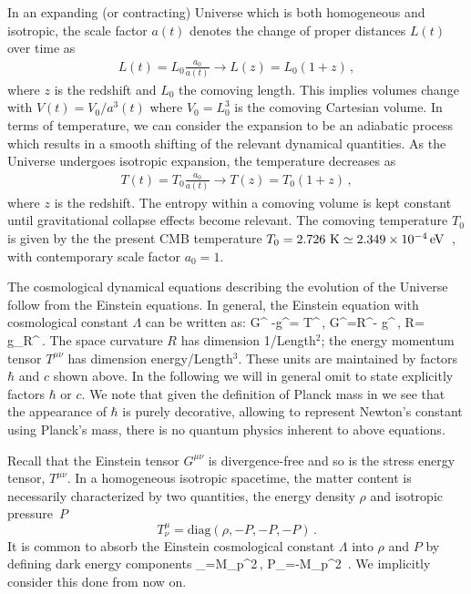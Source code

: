 In an expanding (or contracting) Universe which is both homogeneous and isotropic, the scale factor $a(t)$ denotes the change of proper distances $L(t)$ over time as
\begin{gather}
 L(t)=L_{0}\frac{a_{0}}{a(t)}\rightarrow L(z)=L_{0}(1+z)\,,
\end{gather}
where $z$ is the redshift and $L_{0}$ the comoving length. This implies volumes change with $V(t)=V_{0}/a^{3}(t)$ where $V_{0}=L_{0}^{3}$ is the comoving Cartesian volume. In terms of temperature, we can consider the expansion to be an adiabatic process~\cite{Abdalla:2022yfr} which results in a smooth shifting of the relevant dynamical quantities. As the Universe undergoes isotropic expansion, the temperature decreases as 
\begin{gather}
 \label{tscale}
 T(t)=T_{0}\frac{a_{0}}{a(t)}\rightarrow T(z)=T_{0}(1+z)\,,
\end{gather}
where $z$ is the redshift. The entropy within a comoving volume is kept constant until gravitational collapse effects become relevant. The comoving temperature $T_{0}$ is given by the the present CMB temperature $T_{0}=2.726{\rm\ K}\simeq 2.349\times10^{-4}\text{\,eV}$~\cite{Planck:2018vyg}, with contemporary scale factor $a_{0}=1$.

The cosmological dynamical equations describing the evolution of the Universe follow from the Einstein equations. In general, the Einstein equation with cosmological constant $\Lambda$ can be written as:
\beqn\label{Einstine}
G^{\mu\nu} -\Lambda g^{\mu\nu}= T^{\mu\nu}\,, \quad G^{\mu\nu}=R^{\mu\nu}- g^{\mu\nu}\,,
\quad R= g_{\mu\nu}R^{\mu\nu}\,.
\eeqn
{\color{black}The space curvature $R$ has dimension 1/Length$^2$; the energy momentum tensor $T^{\mu\nu}$ has dimension energy/Length$^3$. These units are maintained by factors $\hbar$ and $c$ shown above. In the following we will in general omit to state explicitly factors $\hbar$ or $c$. We note that given the definition of Planck mass in  we see that the appearance of $\hbar$ is purely decorative, allowing to represent Newton's constant  using Planck's mass, there is no quantum physics inherent to above equations.}

Recall that the Einstein tensor $G^{\mu\nu}$ is divergence-free and so is the stress energy tensor, $T^{\mu\nu}$. In a homogeneous isotropic spacetime, the matter content is necessarily characterized by two quantities, the energy density $\rho$ and isotropic pressure~$P$
\begin{equation}
 T^\mu_\nu =\mathrm{diag}(\rho, -P, -P, -P)\,.
\end{equation}
 It is common to absorb the Einstein cosmological constant $\Lambda$ into $\rho$ and $P$ by defining dark energy components
\beqn\label{EpsLam}
\rho_\Lambda=M_p^2\Lambda\,, \qquad P_\Lambda=-M_p^2 \Lambda\,.
\eeqn
We implicitly consider this done from now on. 

